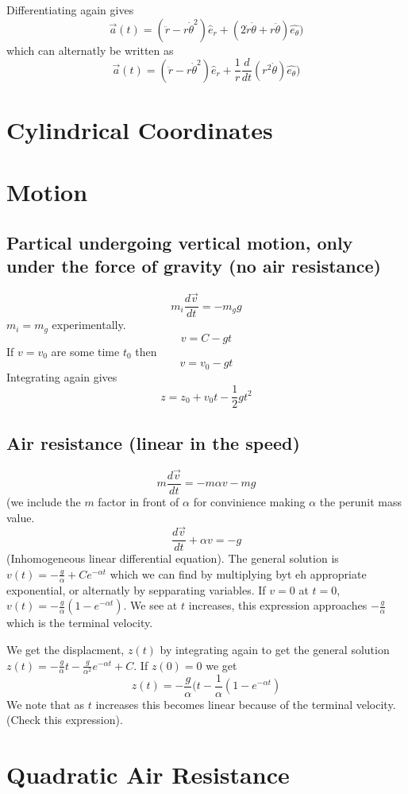 \documentclass{homework}
\begin{document}
Differentiating again gives 
\[\vec{a}(t) = (\ddot{r} - r\dot{\theta}^2)\hat e_r + (2\dot{r}\dot{\theta} + r\ddot{\theta})\hat{e_{\theta}})\]
which can alternatly be written as
\[\vec{a}(t) = (\ddot{r} - r\dot{\theta}^2)\hat e_r + \frac{1}{r}\frac{d}{dt}(r^2\dot{\theta})\hat{e_{\theta}})\]


\section{Cylindrical Coordinates}

\section{Motion}
\subsection{Partical undergoing vertical motion, only under the force of gravity (no air resistance)}
\[m_i\frac{d\vec {v}}{dt} = -m_g g\]
$m_i = m_g$ experimentally.
\[v = C - gt\]
If $v = v_0$ are some time $t_0$ then
\[v = v_0 - gt\]
Integrating again gives
\[z = z_0 + v_0t - \frac{1}{2}gt^2\]
\subsection{Air resistance (linear in the speed)}
\[m\frac{d\vec {v}}{dt} = -m\alpha v-m g\]
(we include the $m$ factor in front of $\alpha$ for convinience making $\alpha$ the perunit mass value.
\[\frac{d\vec {v}}{dt} +\alpha v = - g\]
(Inhomogeneous linear differential equation). The general solution is $v(t) = -\frac{g}{\alpha} + Ce^{-\alpha t}$ which we can find by multiplying byt eh appropriate exponential, or alternatly by sepparating variables. If $v = 0$ at $t = 0$, $v(t) = -\frac{g}{\alpha}(1 - e^{-\alpha t})$. We see at $t$ increases, this expression approaches $-\frac{g}{\alpha}$ which is the terminal velocity.

We get the displacment, $z(t)$  by integrating again to get the general solution $z(t) = -\frac{g}{\alpha} t - \frac{g}{\alpha^2}e^{-\alpha t} + C$. If $z(0) = 0$ we get
\[z(t) = -\frac{g}{\alpha}(t - \frac{1}{\alpha}(1 -  e^{-\alpha t})\]
We note that as $t$ increases this becomes linear because of the terminal velocity. (Check this expression).

\section{Quadratic Air Resistance}
\end{document}
